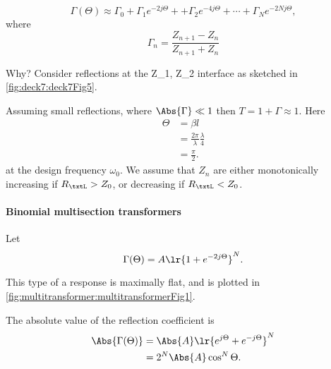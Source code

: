\begin{equation}\label{eqn:uwavesDeck7MultisectionTransformersCore:60}
\Gamma(\Theta) \approx \Gamma_0
+ \Gamma_1 e^{-2 j \Theta} +
+ \Gamma_2 e^{-4 j \Theta} +  \cdots
+ \Gamma_N e^{-2 N j \Theta},
\end{equation}
where
\begin{equation}\label{eqn:uwavesDeck7MultisectionTransformersCore:80}
\Gamma_n = \frac{Z_{n+1} - Z_n}{Z_{n+1} + Z_n}
\end{equation}

Why?  Consider reflections at the Z_1, Z_2 interface as sketched in \cref{fig:deck7:deck7Fig5}.


Assuming small reflections, where \( \Abs{\Gamma} \ll 1 \) then \( T = 1 + \Gamma \approx 1 \).  Here
\begin{equation}\label{eqn:uwavesDeck7MultisectionTransformersCore:100}
\begin{aligned}
\Theta
&= \beta l
\\ &= \frac{2 \pi}{\lambda} \frac{\lambda}{4}
\\ &= \frac{\pi}{2}.
\end{aligned}
\end{equation}
at the design frequency \( \omega_0 \).  We assume that \( Z_n \) are either monotonically increasing if \( R_\txtL > Z_0 \), or decreasing if \( R_\txtL < Z_0 \).
\paragraph{Binomial multisection transformers}
Let
\begin{equation}\label{eqn:uwavesDeck7MultisectionTransformersCore:120}
\Gamma(\Theta) = A \lr{ 1 + e^{-2 j \Theta} }^N.
\end{equation}

This type of a response is maximally flat, and is plotted in \cref{fig:multitransformer:multitransformerFig1}.

The absolute value of the reflection coefficient is
\begin{equation}\label{eqn:uwavesDeck7MultisectionTransformersCore:160}
\begin{aligned}
\Abs{\Gamma(\Theta)}
&=
\Abs{A} \lr{ e^{j \Theta} + e^{- j \Theta} }^N
\\ &=
2^N \Abs{A} \cos^N\Theta.
\end{aligned}
\end{equation}

